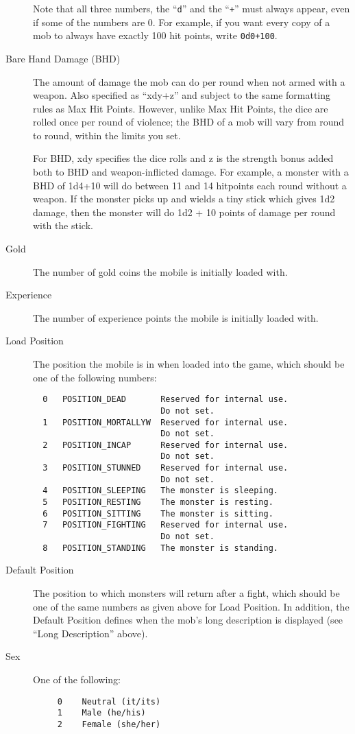 \documentclass[11pt]{article}
\begin{document}
\begin{description}
\par
Note that all three numbers, the ``\texttt{d}'' and the ``\texttt{+}'' must always appear, even if some of the numbers are 0.  For example, if you want every copy of a mob to always have exactly 100 hit points, write \texttt{0d0+100}.
\item[Bare Hand Damage (BHD)] The amount of damage the mob can do per round when not armed with a weapon.  Also specified as ``xdy+z'' and subject to the same formatting rules as Max Hit Points.  However, unlike Max Hit Points, the dice are rolled once per round of violence; the BHD of a mob will vary from round to round, within the limits you set.
\par
For BHD, xdy specifies the dice rolls and z is the strength bonus added both to BHD and weapon-inflicted damage.  For example, a monster with a BHD of 1d4+10 will do between 11 and 14 hitpoints each round without a weapon.  If the monster picks up and wields a tiny stick which gives 1d2 damage, then the monster will do 1d2 + 10 points of damage per round with the stick.
\item[Gold] The number of gold coins the mobile is initially loaded with.
\item[Experience] The number of experience points the mobile is initially loaded with.
\item[Load Position] The position the mobile is in when loaded into the game, which should be one of the following numbers:
\begin{verbatim}
  0   POSITION_DEAD       Reserved for internal use.
                          Do not set.
  1   POSITION_MORTALLYW  Reserved for internal use.
                          Do not set.
  2   POSITION_INCAP      Reserved for internal use.
                          Do not set.
  3   POSITION_STUNNED    Reserved for internal use.
                          Do not set.
  4   POSITION_SLEEPING   The monster is sleeping.
  5   POSITION_RESTING    The monster is resting.
  6   POSITION_SITTING    The monster is sitting.
  7   POSITION_FIGHTING   Reserved for internal use.
                          Do not set.
  8   POSITION_STANDING   The monster is standing.
\end{verbatim}
\item[Default Position] The position to which monsters will return after a fight, which should be one of the same numbers as given above for Load Position. In addition, the Default Position defines when the mob's long description is displayed (see ``Long Description'' above).
\item[Sex] One of the following:
\begin{verbatim}
     0    Neutral (it/its)
     1    Male (he/his)
     2    Female (she/her)
\end{verbatim}
\end{description}
\end{document}
